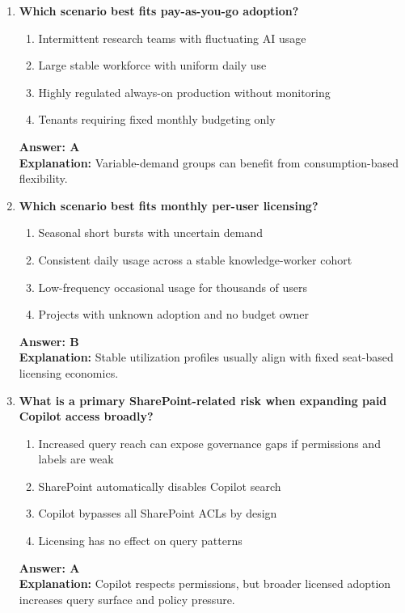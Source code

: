 \documentclass[10pt]{article}
\begin{document}
\begin{enumerate}[leftmargin=*]
\item \textbf{Which scenario best fits pay-as-you-go adoption?}
\begin{enumerate}[label=\Alph*.]
  \item Intermittent research teams with fluctuating AI usage
  \item Large stable workforce with uniform daily use
  \item Highly regulated always-on production without monitoring
  \item Tenants requiring fixed monthly budgeting only
\end{enumerate}
\textbf{Answer: A}\\
\textbf{Explanation:} Variable-demand groups can benefit from consumption-based flexibility.

\item \textbf{Which scenario best fits monthly per-user licensing?}
\begin{enumerate}[label=\Alph*.]
  \item Seasonal short bursts with uncertain demand
  \item Consistent daily usage across a stable knowledge-worker cohort
  \item Low-frequency occasional usage for thousands of users
  \item Projects with unknown adoption and no budget owner
\end{enumerate}
\textbf{Answer: B}\\
\textbf{Explanation:} Stable utilization profiles usually align with fixed seat-based licensing economics.

\item \textbf{What is a primary SharePoint-related risk when expanding paid Copilot access broadly?}
\begin{enumerate}[label=\Alph*.]
  \item Increased query reach can expose governance gaps if permissions and labels are weak
  \item SharePoint automatically disables Copilot search
  \item Copilot bypasses all SharePoint ACLs by design
  \item Licensing has no effect on query patterns
\end{enumerate}
\textbf{Answer: A}\\
\textbf{Explanation:} Copilot respects permissions, but broader licensed adoption increases query surface and policy pressure.


\end{enumerate}
\end{document}
